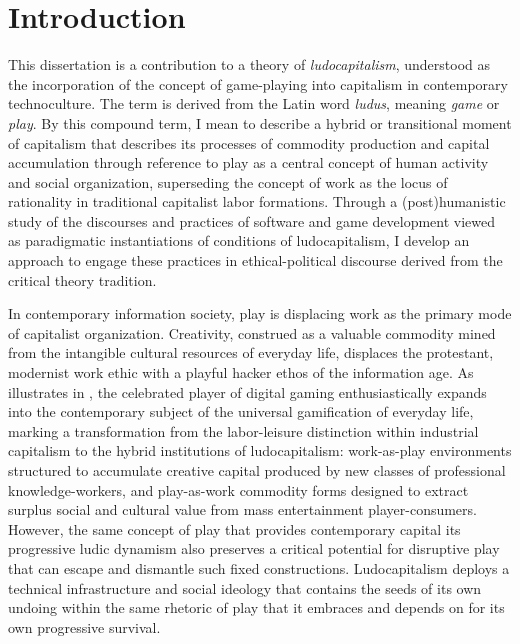 \chapter*{Introduction}
 

This dissertation is a contribution to a theory of \emph{ludocapitalism}, understood as the incorporation of the concept of game-playing into capitalism in contemporary technoculture. The term is derived from the Latin word \emph{ludus}, meaning \emph{game} or \emph{play}. By this compound term, I mean to describe a hybrid or transitional moment of capitalism that describes its processes of commodity production and capital accumulation through reference to play as a central concept of human activity and social organization, superseding the concept of work as the locus of rationality in traditional capitalist labor formations. Through a (post)humanistic study of the discourses and practices of software and game development viewed as paradigmatic instantiations of conditions of ludocapitalism, I develop an approach to engage these practices in ethical-political discourse derived from the critical theory tradition.

In contemporary information society, play is displacing work as the primary mode
of capitalist organization. Creativity, construed as a valuable commodity mined
from the intangible cultural resources of everyday life, displaces the
protestant, modernist work ethic with a playful hacker ethos of the information
age. As \citeauthor{Wark2007-ya} illustrates in , the celebrated player of digital gaming
enthusiastically expands into the contemporary subject of the universal
gamification of everyday life, marking a transformation from the labor-leisure
distinction within industrial capitalism to the hybrid institutions of
ludocapitalism: work-as-play environments structured to accumulate creative
capital produced by new classes of professional knowledge-workers, and
play-as-work commodity forms designed to extract surplus social and cultural
value from mass entertainment player-consumers. However,
the same concept of play that provides contemporary capital its progressive
ludic dynamism also preserves a critical potential for disruptive play that can
escape and dismantle such fixed constructions. Ludocapitalism deploys a
technical infrastructure and social ideology that contains the seeds of its own
undoing within the same rhetoric of play that it embraces and depends on for its
own progressive survival.

